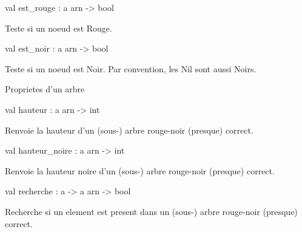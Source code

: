 \documentclass[11pt]{article}
\begin{document}
\label{val:Arn-underscoredoc.est-underscorerouge}\begin{ocamldoccode}
val est_rouge : {\textquotesingle}a arn -> bool
\end{ocamldoccode}
\begin{ocamldocdescription}
Teste si un noeud est Rouge.


\end{ocamldocdescription}




\label{val:Arn-underscoredoc.est-underscorenoir}\begin{ocamldoccode}
val est_noir : {\textquotesingle}a arn -> bool
\end{ocamldoccode}
\begin{ocamldocdescription}
Teste si un noeud est Noir.
    Par convention, les Nil sont aussi Noirs.


\end{ocamldocdescription}




Proprietes d'un arbre



\label{val:Arn-underscoredoc.hauteur}\begin{ocamldoccode}
val hauteur : {\textquotesingle}a arn -> int
\end{ocamldoccode}
\begin{ocamldocdescription}
Renvoie la hauteur d'un (sous-) arbre rouge-noir 
    (presque) correct.


\end{ocamldocdescription}




\label{val:Arn-underscoredoc.hauteur-underscorenoire}\begin{ocamldoccode}
val hauteur_noire : {\textquotesingle}a arn -> int
\end{ocamldoccode}
\begin{ocamldocdescription}
Renvoie la hauteur noire d'un (sous-) arbre rouge-noir
    (presque) correct.


\end{ocamldocdescription}




\label{val:Arn-underscoredoc.recherche}\begin{ocamldoccode}
val recherche : {\textquotesingle}a -> {\textquotesingle}a arn -> bool
\end{ocamldoccode}
\begin{ocamldocdescription}
Recherche si un element est present dans un (sous-) arbre
    rouge-noir (presque) correct.


\end{ocamldocdescription}
\end{document}
